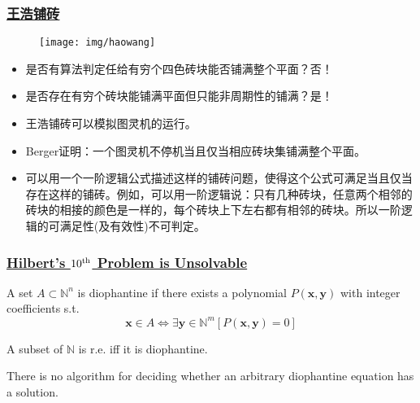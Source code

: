 \documentclass[UTF8,11pt,colorlinks,compress,openany]{beamer}%
\begin{document}
\begin{frame}\frametitle{\href{https://arxiv.org/abs/1506.06492}{王浩铺砖}}
	\begin{figure}
		\texttt{[image: img/haowang]}%
	\end{figure}
\begin{itemize}
	\item 是否有算法判定任给有穷个四色砖块能否铺满整个平面？否！
	\item 是否存在有穷个砖块能铺满平面但只能非周期性的铺满？是！
	\item 王浩铺砖可以模拟图灵机的运行。
	\item Berger证明：一个图灵机不停机当且仅当相应砖块集铺满整个平面。
	\item 可以用一个一阶逻辑公式描述这样的铺砖问题，使得这个公式可满足当且仅当存在这样的铺砖。例如，可以用一阶逻辑说：只有几种砖块，任意两个相邻的砖块的相接的颜色是一样的，每个砖块上下左右都有相邻的砖块。所以一阶逻辑的可满足性(及有效性)不可判定。
\end{itemize}
\end{frame}

\begin{frame}\frametitle{\href{http://120.52.51.18/www.math.umd.edu/~laskow/Pubs/713/Diophantine.pdf}{Hilbert's $10\textsuperscript{th}$ Problem is Unsolvable}}
	\setlength\abovedisplayskip{0pt}
	\setlength\belowdisplayskip{0pt}
	\begin{definition}
		A set $A\subset\mathbb{N}^n$ is diophantine if there exists a polynomial $P(\mathbf{x},\mathbf{y})$ with integer coefficients s.t.
		\[\mathbf{x}\in A\iff\exists \mathbf{y}\in\mathbb{N}^m [P(\mathbf{x},\mathbf{y})=0]\]
	\end{definition}
	\begin{theorem}
	A subset of $\mathbb{N}$ is r.e. iff it is diophantine.
	\end{theorem}
	\begin{block}{}
	There is no algorithm for deciding whether an arbitrary diophantine equation has a solution.
	\end{block}\vspace{-1ex}
		\begin{figure}[H]
		\end{figure}
\end{frame}
\end{document}
